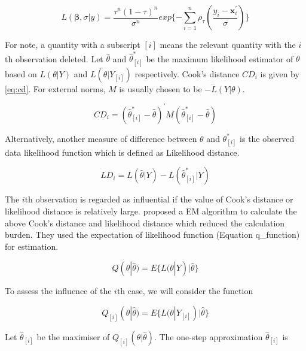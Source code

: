 \documentclass[article]{jss}
\theoremstyle{definition}
\theoremstyle{definition}
\theoremstyle{remark}
\begin{document}
\begin{equation}
L(\mathbf{\beta},\sigma|y)=\frac{\tau^{n}(1-\tau)^{n}}{\sigma^{n}}exp\{-\sum_{i=1}^{n} \rho_{\tau}(\frac{y_i-\boldsymbol{x}^{'}_{i}}{\sigma})\}
\label{eq:ald_likelihood}
\end{equation}

For note, a quantity with a subscript \([i]\) means the relevant
quantity with the \(i\)th observation deleted. Let \(\hat{\theta}\) and
\(\hat{\theta}^{*}_{[i]}\) be the maximum likelihood estimator of
\(\theta\) based on \(L(\theta|Y)\) and \(L(\theta|Y_{[i]})\)
respectively. Cook's distance \(CD_{i}\) is given by \eqref{eq:cd}. For
external norms, \(M\) is usually chosen to be \(-\ddot{L}(Y|\theta)\).

\begin{equation}
CD_{i}=(\hat{\theta}^{*}_{[i]}-\hat{\theta})^{'}M(\hat{\theta}^{*}_{[i]}-\hat{\theta})
\label{eq:cd}
\end{equation}

Alternatively, another measure of difference between \(\theta\) and
\(\theta^{*}_{[i]}\) is the observed data likelihood function which is
defined as Likelihood distance.

\begin{equation}
LD_i=L(\hat{\theta}|Y)-L(\hat{\theta}^{*}_{[i]}|Y)
\label{eq: ld}
\end{equation}

The \(i\)th observation is regarded as influential if the value of
Cook's distance or likelihood distance is relatively large.
\citet{benites2015case} proposed a EM algorithm to calculate the above
Cook's distance and likelihood distance which reduced the calculation
burden. They used the expectation of likelihood function (Equation
q\_function) for estimation.

\begin{equation}
Q(\theta|\hat{\theta})=E\{L(\theta|Y)|\hat{\theta}\}
\label{eq:q_function}
\end{equation}

To assess the influence of the \(i\)th case, we will consider the
function

\begin{equation}
Q_{[i]}(\theta|\hat{\theta})=E\{L(\theta|Y_{[i]})|\hat{\theta}\}
\label{eq: q_one_deletion}
\end{equation}

Let \(\hat{\theta}_{[i]}\) be the maximiser of
\(Q_{[i]}(\theta|\hat{\theta})\). The one-step approximation
\(\hat{\theta}_{[i]}\) is
\end{document}
